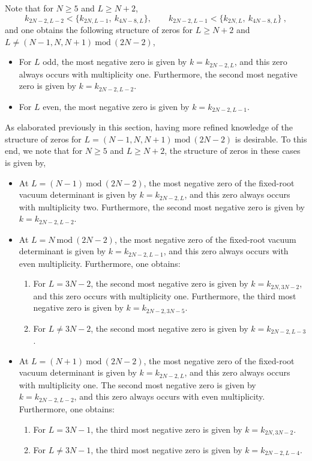 Note that for $N \geqslant 5$ and $L \geqslant N+2$,
\begin{equation}
    k_{2N-2,L-2} < \{k_{2N,L-1}, \ k_{4N-8, L}\}, \qquad k_{2N-2,L-1} < \{k_{2N,L}, \ k_{4N-8, L}\}~,
\end{equation}
and one obtains the following structure of zeros for $L \geqslant N+2$ and $L \neq (N-1,N,N+1)~\text{mod}~(2N-2)$, 
\begin{itemize}
    \item For $L$ odd, the most negative zero is given by $k = k_{2N-2, L}$, and this zero always occurs with multiplicity one. Furthermore, the second most negative zero is given by $k = k_{2N-2, L-2}$. 
    \item For $L$ even, the most negative zero is given by $k = k_{2N-2,L-1}$. 
\end{itemize}
As elaborated previously in this section, having more refined knowledge of the structure of zeros for $L = (N-1,N,N+1)~\text{mod}~(2N-2)$ is desirable. To this end, we note that for $N \geqslant 5$ and $L \geqslant N+2$, the structure of zeros in these cases is given by,
\begin{itemize}
    \item At $L = (N-1)~\text{mod}~(2N-2)$, the most negative zero of the fixed-root vacuum determinant is given by $k = k_{2N-2, L}$, and this zero always occurs with multiplicity two. Furthermore, the second most negative zero is given by $k = k_{2N-2, L-2}$. 
    \item At $L = N~\text{mod}~(2N-2)$, the most negative zero of the fixed-root vacuum determinant is given by $k = k_{2N-2, L-1}$, and this zero always occurs with even multiplicity. Furthermore, one obtains: 
    \begin{enumerate}
        \item For $L = 3N-2$, the second most negative zero is given by $k = k_{2N, 3N-2}$, and this zero occurs with multiplicity one. Furthermore, the third most negative zero is given by $k = k_{2N-2, 3N-5}$.
        \item For $L \neq 3N-2$, the second most negative zero is given by $k = k_{2N-2, L-3}$. 
    \end{enumerate}
    \item At $L = (N+1)~\text{mod}~(2N-2)$, the most negative zero of the fixed-root vacuum determinant is given by $k = k_{2N-2, L}$, and this zero always occurs with multiplicity one. The second most negative zero is given by $k = k_{2N-2,L-2}$, and this zero always occurs with even multiplicity. Furthermore, one obtains: 
    \begin{enumerate}
        \item For $L = 3N-1$, the third most negative zero is given by $k = k_{2N, 3N-2}$.
        \item For $L \neq 3N-1$, the third most negative zero is given by $k = k_{2N-2, L-4}$. 
    \end{enumerate}
\end{itemize}

